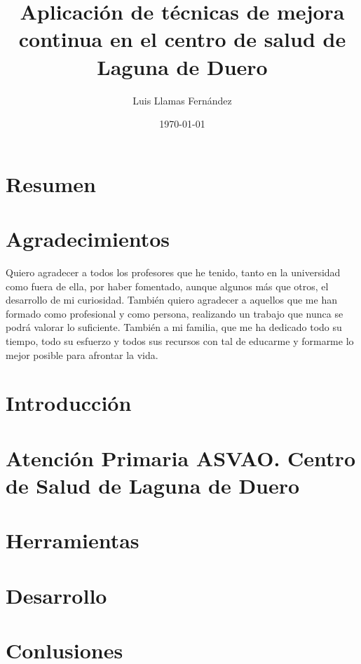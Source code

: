 \documentclass[12pt, a4paper]{report}
\begin{document}
\title{Aplicación de técnicas de mejora continua en el centro de salud de Laguna de Duero}
\author{Luis Llamas Fernández}
\date{\today}
\maketitle

\chapter*{Resumen}
\chapter*{Agradecimientos}

Quiero agradecer a todos los profesores que he tenido, tanto en la universidad como fuera de ella, por haber fomentado, aunque algunos más que otros, el desarrollo de mi curiosidad. También quiero agradecer a aquellos que me han formado como profesional y como persona, realizando un trabajo que nunca se podrá valorar lo suficiente. También a mi familia, que me ha dedicado todo su tiempo, todo su esfuerzo y todos sus recursos con tal de educarme y formarme lo mejor posible para afrontar la vida.

\tableofcontents

\chapter{Introducción}


\chapter{Atención Primaria ASVAO. Centro de Salud de Laguna de Duero}


\chapter{Herramientas}
\chapter{Desarrollo}
\chapter{Conlusiones}


\end{document}
